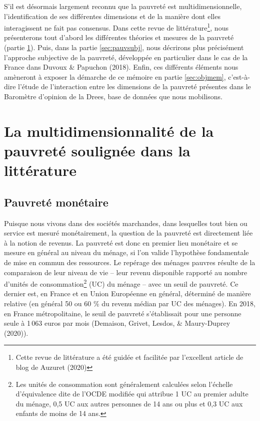 \documentclass[12pt,a4paper]{reedthesis}
\begin{document}
S'il est désormais largement reconnu que la pauvreté est multidimensionnelle, l'identification de ses différentes dimensions et de la manière dont elles interagissent ne fait pas consensus. Dans cette revue de littérature\footnote{Cette revue de littérature a été guidée et facilitée par l'excellent article de blog de Auzuret (2020)}, nous présenterons tout d'abord les différentes théories et mesures de la pauvreté (partie \ref{sec:multidim}). Puis, dans la partie \ref{sec:pauvsubj}, nous décrirons plus précisément l'approche subjective de la pauvreté, développée en particulier dans le cas de la France dans Duvoux \& Papuchon (2018). Enfin, ces différents éléments nous amèneront à exposer la démarche de ce mémoire en partie \ref{sec:objmem}, c'est-à-dire l'étude de l'interaction entre les dimensions de la pauvreté présentes dans le Baromètre d'opinion de la Drees, base de données que nous mobilisons.

\hypertarget{sec:multidim}{%
\section{La multidimensionnalité de la pauvreté soulignée dans la littérature}\label{sec:multidim}}

\hypertarget{sec:monetaire}{%
\subsection{Pauvreté monétaire}\label{sec:monetaire}}

Puisque nous vivons dans des sociétés marchandes, dans lesquelles tout bien ou service est mesuré monétairement, la question de la pauvreté est directement liée à la notion de revenus. La pauvreté est donc en premier lieu monétaire et se mesure en général au niveau du ménage, si l'on valide l'hypothèse fondamentale de mise en commun des ressources. Le repérage des ménages pauvres résulte de la comparaison de leur niveau de vie -- leur revenu disponible rapporté au nombre d'unités de consommation\footnote{Les unités de consommation sont généralement calculées selon l'échelle d'équivalence dite de l'OCDE modifiée qui attribue 1 UC au premier adulte du ménage, 0,5 UC aux autres personnes de 14 ans ou plus et 0,3 UC aux enfants de moins de 14 ans.} (UC) du ménage -- avec un seuil de pauvreté. Ce dernier est, en France et en Union Européenne en général, déterminé de manière relative (en général 50 ou 60 \% du revenu médian par UC des ménages). En 2018, en France métropolitaine, le seuil de pauvreté s'établissait pour une personne seule à 1\,063 euros par mois (Demaison, Grivet, Lesdos, \& Maury-Duprey (2020)).
\end{document}
